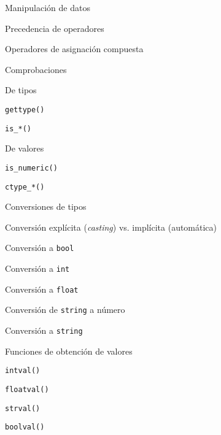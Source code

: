 \begin{longenum}
\begin{longenum}
        \item Manipulación de datos
        \begin{longenum}
            \item Precedencia de operadores
            \item Operadores de asignación compuesta
            \item Comprobaciones
            \begin{longenum}
                \item De tipos
                \begin{longenum}
                    \item \texttt{gettype()}
                    \item \texttt{is\_*()}
                \end{longenum}
                \item De valores
                \begin{longenum}
                    \item \texttt{is\_numeric()}
                    \item \texttt{ctype\_*()}
                \end{longenum}
            \end{longenum}
            \item Conversiones de tipos
            \begin{longenum}
                \item Conversión explícita (\textit{casting}) vs. implícita (automática)
                \item Conversión a \texttt{bool}
                \item Conversión a \texttt{int}
                \item Conversión a \texttt{float}
                \item Conversión de \texttt{string} a número
                \item Conversión a \texttt{string}
                \item Funciones de obtención de valores
                \begin{longenum}
                    \item \texttt{intval()}
                    \item \texttt{floatval()}
                    \item \texttt{strval()}
                    \item \texttt{boolval()}
                \end{longenum}

\end{longenum}
\end{longenum}
\end{longenum}
\end{longenum}
